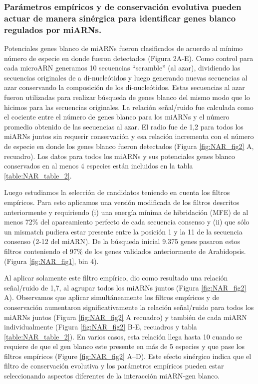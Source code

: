 \subsubsection{Parámetros empíricos y de conservación evolutiva pueden actuar de manera sinérgica para identificar genes blanco regulados por miARNs.}
Potenciales genes blanco de miARNs fueron clasificados de acuerdo al mínimo número de especie en donde fueron detectados (Figura 2A-E).
Como control para cada microARN generamos 10 secuencias “scramble” (al azar), dividiendo las secuencias originales de a di-nucleótidos y luego generando nuevas secuencias al azar conservando la composición de los di-nucleótidos.
Estas secuencias al azar fueron utilizadas para realizar búsqueda de genes blanco del mismo modo que lo hicimos para las secuencias originales.
La relación señal/ruido fue calculada como el cociente entre el número de genes blanco para los miARNs y el número promedio obtenido de las secuencias al azar.
El radio fue de 1,2 para todos los miARNs juntos sin requerir conservación y esa relación incrementa con el número de especie en donde los genes blanco fueron detectados (Figura \ref{fig:NAR_fig2} A, recuadro). 
Los datos para todos los miARNs y sus potenciales genes blanco conservados en al menos 4 especies están incluidos en la tabla \ref{table:NAR_table_2}.

Luego estudiamos la selección de candidatos teniendo en cuenta los filtros empíricos.
Para esto aplicamos una versión modificada de los filtros descritos anteriormente y requiriendo (i) una energía mínima de hibridación (MFE) de al menos 72\% del apareamiento perfecto de cada secuencia consenso y (ii) que sólo un mismatch pudiera estar presente entre la posición 1 y la 11 de la secuencia consenso (2-12 del miARN).
De la búsqueda inicial 9.375 genes pasaron estos filtros conteniendo el 97\% de los genes validados anteriormente de Arabidopsis. (Figura \ref{fig:NAR_fig1}, bin 4). 

Al aplicar solamente este filtro empírico, dio como resultado una relación señal/ruido de 1,7, al agrupar todos los miARNs juntos (Figura \ref{fig:NAR_fig2} A).
Observamos que aplicar simultáneamente los filtros empíricos y de conservación aumentaron significativamente la relación señal/ruido para todos los miARNs juntos (Figura \ref{fig:NAR_fig2} A recuadro) y también de cada miARN individualmente (Figura \ref{fig:NAR_fig2} B-E, recuadros y tabla \ref{table:NAR_table_2}).
En varios casos, esta relación llega hasta 10 cuando se requiere de que el gen blanco este presente en más de 5 especies y que pase los filtros empíricos (Figure \ref{fig:NAR_fig2} A–D).
Este efecto sinérgico indica que el filtro de conservación evolutiva y los parámetros empíricos pueden estar seleccionando aspectos diferentes de la interacción miARN-gen blanco.

